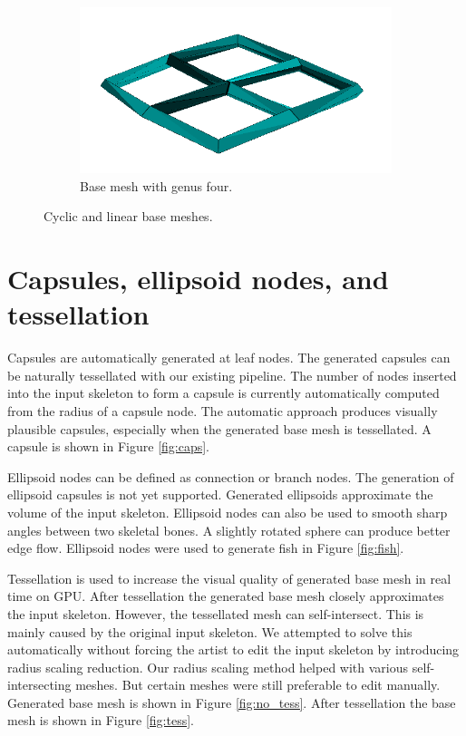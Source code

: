 \begin{figure}[h]
        \begin{subfigure}[b]{0.5\textwidth}
        	\centering
                \includegraphics[width=\textwidth]{images/cycle_mesh.png}
                \caption{Base mesh with genus four.}
                \label{fig:cyclic_mesh}
        \end{subfigure}
        \caption[Cyclic and linear base meshes]{Cyclic and linear base meshes.}\label{fig:pavuk}
\end{figure}

\section{Capsules, ellipsoid nodes, and tessellation}

Capsules are automatically generated at leaf nodes.
The generated capsules can be naturally tessellated with our existing pipeline.
The number of nodes inserted into the input skeleton to form a capsule is currently automatically computed from the radius of a capsule node.
The automatic approach produces visually plausible capsules, especially when the generated base mesh is tessellated.
A capsule is shown in Figure \ref{fig:caps}.

Ellipsoid nodes can be defined as connection or branch nodes.
The generation of ellipsoid capsules is not yet supported.
Generated ellipsoids approximate the volume of the input skeleton.
Ellipsoid nodes can also be used to smooth sharp angles between two skeletal bones.
A slightly rotated sphere can produce better edge flow.
Ellipsoid nodes were used to generate fish in Figure \ref{fig:fish}.

Tessellation is used to increase the visual quality of generated base mesh in real time on GPU.
After tessellation the generated base mesh closely approximates the input skeleton.
However, the tessellated mesh can self-intersect.
This is mainly caused by the original input skeleton.
We attempted to solve this automatically without forcing the artist to edit the input skeleton by introducing radius scaling reduction.
Our radius scaling method helped with various self-intersecting meshes.
But certain meshes were still preferable to edit manually.
Generated base mesh is shown in Figure \ref{fig:no_tess}.
After tessellation the base mesh is shown in Figure \ref{fig:tess}.

